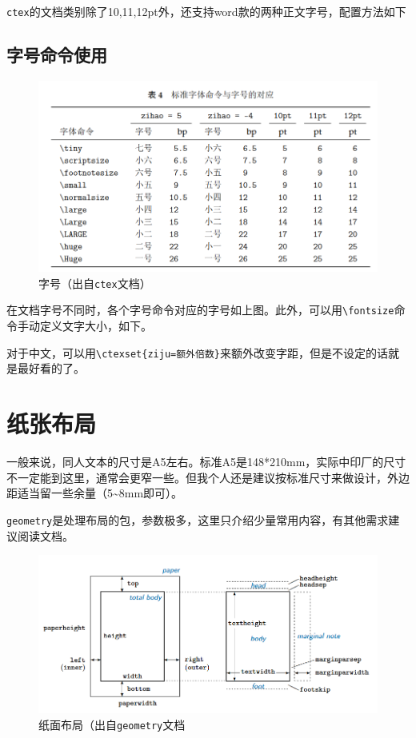 \documentclass[10pt,openany]{book}
\begin{document}
\begin{sloppypar}
\texttt{ctex}的文档类别除了10,11,12pt外，还支持word款的两种正文字号，配置方法如下



\subsection{字号命令使用}

\begin{figure}[H]
    \centering
    \includegraphics[width=\linewidth]{data/fontsize.png}
    \caption{字号（出自\texttt{ctex}文档）}
\end{figure}

在文档字号不同时，各个字号命令对应的字号如上图。此外，可以用\texttt{\textbackslash{}fontsize}命令手动定义文字大小，如下。



对于中文，可以用\texttt{\textbackslash{}ctexset\{ziju=额外倍数\}}来额外改变字距，但是不设定的话就是最好看的了。

\section{纸张布局}

一般来说，同人文本的尺寸是A5左右。标准A5是148*210mm，实际中印厂的尺寸不一定能到这里，通常会更窄一些。但我个人还是建议按标准尺寸来做设计，外边距适当留一些余量（5\textasciitilde8mm即可）。

\texttt{geometry}是处理布局的包，参数极多，这里只介绍少量常用内容，有其他需求建议阅读文档。

\begin{figure}[H]
    \centering
    \includegraphics[width=\linewidth]{data/paper.png}
    \caption{纸面布局（出自\texttt{geometry}文档}
\end{figure}


\end{sloppypar}
\end{document}
